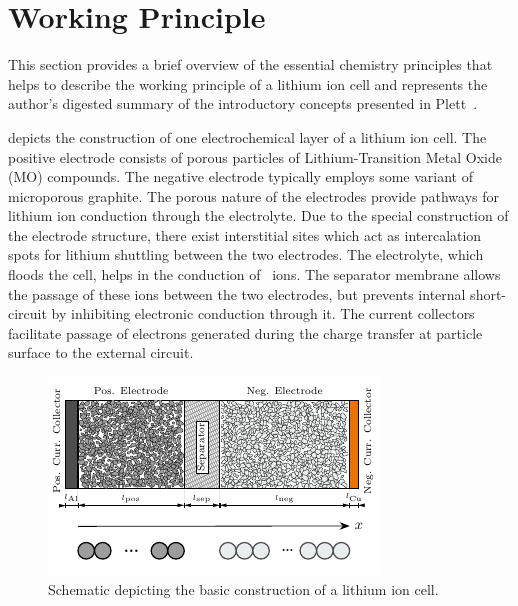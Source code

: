 

\section{Working Principle}\label{subsec:liionchemistry}

This section  provides a  brief overview of  the essential  chemistry principles
that  helps  to  describe the  working  principle  of  a  lithium ion  cell  and
represents the author's digested summary  of the introductory concepts presented
in Plett~\cite{Plett2015}.

 depicts the construction of one electrochemical
layer of a lithium ion cell. The positive electrode consists of porous particles
of  Lithium-Transition  Metal  Oxide  (MO)  compounds.  The  negative  electrode
typically employs some variant of microporous graphite. The porous nature of the
electrodes provide pathways for lithium  ion conduction through the electrolyte.
Due  to  the  special  construction  of the  electrode  structure,  there  exist
interstitial  sites  which act  as  intercalation  spots for  lithium  shuttling
between the two electrodes. The electrolyte, which floods the cell, helps in the
conduction of ~ions. The separator membrane allows the passage of these
ions  between  the  two  electrodes,  but  prevents  internal  short-circuit  by
inhibiting electronic  conduction through it. The  current collectors facilitate
passage of electrons generated during the charge transfer at particle surface to
the external circuit.

\begin{figure}[!htbp]
    \centering
    \includegraphics[width=\textwidth]{cropped_cell_sandwich_for_thesis}
    \caption[Illustration of a lithium ion cell]{Schematic depicting the basic construction of a lithium ion cell.}
    \label{fig:chargetransferprocess}
\end{figure}

